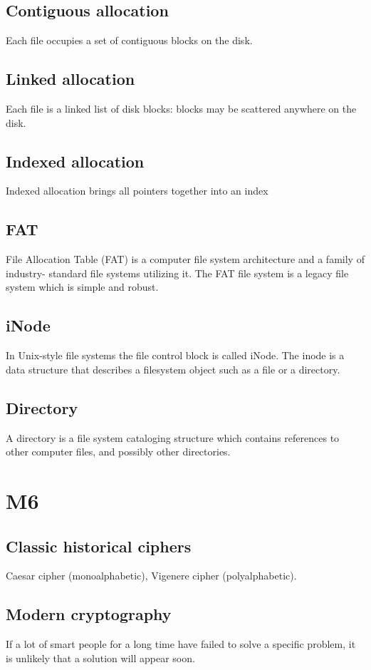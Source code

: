 \subsection{Contiguous allocation}
Each file occupies a set of contiguous blocks on the disk.

\subsection{Linked allocation}
Each file is a linked list of disk blocks: blocks may be
scattered anywhere on the disk.

\subsection{Indexed allocation}
Indexed allocation brings all pointers together into an index

\subsection{FAT}
File Allocation Table (FAT) is a computer file
system architecture and a family of industry-
standard file systems utilizing it. The FAT file
system is a legacy file system which is simple and robust.

\subsection{iNode}
In Unix-style file systems the file control
block is called iNode.
The inode is a data structure that
describes a filesystem object such as
a file or a directory.

\subsection{Directory}
 A directory is a file system cataloging
structure which contains references to
other computer files, and possibly other
directories.

\section{M6}
\subsection{Classic historical ciphers}
Caesar cipher (monoalphabetic),
Vigenere cipher (polyalphabetic).

\subsection{Modern cryptography}
If a lot of smart people for a long time have failed to solve a specific problem,
it is unlikely that a solution will appear soon. \newline

